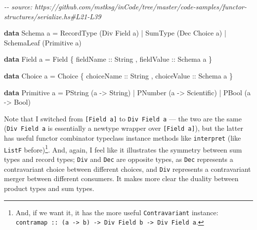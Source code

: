 \documentclass[]{article}
\newenvironment{Shaded}{}{}
\newcommand{\CommentTok}[1]{\textcolor[rgb]{0.38,0.63,0.69}{\textit{#1}}}
\newcommand{\DataTypeTok}[1]{\textcolor[rgb]{0.56,0.13,0.00}{#1}}
\newcommand{\KeywordTok}[1]{\textcolor[rgb]{0.00,0.44,0.13}{\textbf{#1}}}
\newcommand{\NormalTok}[1]{#1}
\newcommand{\OperatorTok}[1]{\textcolor[rgb]{0.40,0.40,0.40}{#1}}
\newcommand{\OtherTok}[1]{\textcolor[rgb]{0.00,0.44,0.13}{#1}}
\begin{document}
\begin{Shaded}
\begin{Highlighting}[]
\CommentTok{{-}{-} source: https://github.com/mstksg/inCode/tree/master/code{-}samples/functor{-}structures/serialize.hs\#L21{-}L39}

\KeywordTok{data} \DataTypeTok{Schema}\NormalTok{ a }\OtherTok{=}
      \DataTypeTok{RecordType}\NormalTok{  (}\DataTypeTok{Div} \DataTypeTok{Field}\NormalTok{  a)}
    \OperatorTok{|} \DataTypeTok{SumType}\NormalTok{     (}\DataTypeTok{Dec} \DataTypeTok{Choice}\NormalTok{ a)}
    \OperatorTok{|} \DataTypeTok{SchemaLeaf}\NormalTok{  (}\DataTypeTok{Primitive}\NormalTok{ a)}

\KeywordTok{data} \DataTypeTok{Field}\NormalTok{ a }\OtherTok{=} \DataTypeTok{Field}
\NormalTok{    \{}\OtherTok{ fieldName  ::} \DataTypeTok{String}
\NormalTok{    ,}\OtherTok{ fieldValue ::} \DataTypeTok{Schema}\NormalTok{ a}
\NormalTok{    \}}

\KeywordTok{data} \DataTypeTok{Choice}\NormalTok{ a }\OtherTok{=} \DataTypeTok{Choice}
\NormalTok{    \{}\OtherTok{ choiceName  ::} \DataTypeTok{String}
\NormalTok{    ,}\OtherTok{ choiceValue ::} \DataTypeTok{Schema}\NormalTok{ a}
\NormalTok{    \}}

\KeywordTok{data} \DataTypeTok{Primitive}\NormalTok{ a }\OtherTok{=}
      \DataTypeTok{PString}\NormalTok{ (a }\OtherTok{{-}\textgreater{}} \DataTypeTok{String}\NormalTok{)}
    \OperatorTok{|} \DataTypeTok{PNumber}\NormalTok{ (a }\OtherTok{{-}\textgreater{}} \DataTypeTok{Scientific}\NormalTok{)}
    \OperatorTok{|} \DataTypeTok{PBool}\NormalTok{   (a }\OtherTok{{-}\textgreater{}} \DataTypeTok{Bool}\NormalTok{)}
\end{Highlighting}
\end{Shaded}

Note that I switched from \texttt{{[}Field\ a{]}} to \texttt{Div\ Field\ a} ---
the two are the same (\texttt{Div\ Field\ a} is essentially a newtype wrapper
over \texttt{{[}Field\ a{]}}), but the latter has useful functor combinator
typeclass instance methods like \texttt{interpret} (like \texttt{ListF}
before)\footnote{And, if we want it, it has the more useful
  \texttt{Contravariant} instance:
  \texttt{contramap\ ::\ (a\ -\textgreater{}\ b)\ -\textgreater{}\ Div\ Field\ b\ -\textgreater{}\ Div\ Field\ a}.}.
And, again, I feel like it illustrates the symmetry between sum types and record
types; \texttt{Div} and \texttt{Dec} are opposite types, as \texttt{Dec}
represents a contravariant choice between different choices, and \texttt{Div}
represents a contravariant merger between different consumers. It makes more
clear the duality between product types and sum types.
\end{document}
